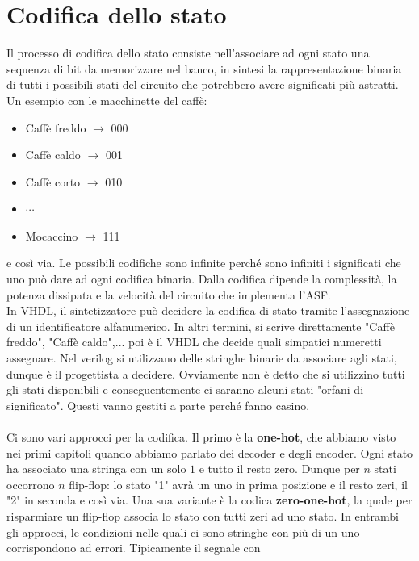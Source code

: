 \documentclass{book}
\begin{document}
    \section{Codifica dello stato}
        Il processo di codifica dello stato consiste nell'associare ad ogni 
        stato una sequenza di bit da memorizzare nel banco, in sintesi la rappresentazione binaria
        di tutti i possibili stati del circuito che potrebbero avere significati più astratti. Un esempio con le
        macchinette del caffè:
        \begin{itemize}
            \item Caffè freddo $\to$ 000
            \item Caffè caldo $\to$ 001
            \item Caffè corto $\to$ 010
            \item $\cdots $
            \item Mocaccino $\to$ 111
        \end{itemize}
        e così via. Le possibili codifiche sono infinite perché sono infiniti i significati che uno può 
        dare ad ogni codifica binaria. Dalla codifica dipende la complessità, la potenza dissipata e la velocità del
        circuito che implementa l'ASF. \\
        In VHDL, il sintetizzatore può decidere la codifica di stato tramite l'assegnazione di un identificatore alfanumerico.
        In altri termini, si scrive direttamente "Caffè freddo", "Caffè caldo",... poi è il VHDL che decide quali simpatici
        numeretti assegnare. Nel verilog si utilizzano delle stringhe binarie da associare agli stati, dunque è il progettista a decidere.
        Ovviamente non è detto che si utilizzino tutti gli stati disponibili e conseguentemente ci saranno alcuni stati 
        "orfani di significato". Questi vanno gestiti a parte perché fanno casino. \\ \\
        Ci sono vari approcci per la codifica. Il primo è la \textbf{one-hot}, che abbiamo visto nei primi capitoli
        quando abbiamo parlato dei decoder e degli encoder. Ogni stato ha associato una stringa con un solo $1$ e tutto il resto zero.
        Dunque per $n$ stati occorrono $n$ flip-flop: lo stato "1" avrà un uno in prima posizione e il resto zeri, il "2" in seconda e così via.
        Una sua variante è la codica \textbf{zero-one-hot}, la quale per risparmiare un flip-flop associa lo stato con tutti zeri ad uno stato.
        In entrambi gli approcci, le condizioni nelle quali ci sono stringhe con più di un uno corrispondono ad errori. Tipicamente il segnale con
\end{document}
